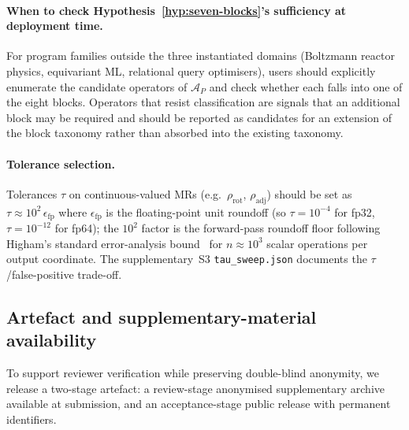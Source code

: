 \documentclass[acmsmall, screen]{acmart}
\begin{document}
\paragraph{When to check Hypothesis~\ref{hyp:seven-blocks}'s sufficiency at deployment time.} For program families outside the three instantiated domains (Boltzmann reactor physics, equivariant ML, relational query optimisers), users should explicitly enumerate the candidate operators of $\mathcal{A}_P$ and check whether each falls into one of the eight blocks. Operators that resist classification are signals that an additional block may be required and should be reported as candidates for an extension of the block taxonomy rather than absorbed into the existing taxonomy.

\paragraph{Tolerance selection.} Tolerances $\tau$ on continuous-valued MRs (e.g.\ $\rho_{\mathrm{rot}}$, $\rho_{\mathrm{adj}}$) should be set as $\tau \approx 10^{2}\, \epsilon_{\mathrm{fp}}$ where $\epsilon_{\mathrm{fp}}$ is the floating-point unit roundoff (so $\tau = 10^{-4}$ for fp32, $\tau = 10^{-12}$ for fp64); the $10^{2}$ factor is the forward-pass roundoff floor following Higham's standard error-analysis bound~\cite{Higham2002Accuracy} for $n \approx 10^{3}$ scalar operations per output coordinate. The supplementary~S3 \texttt{tau\_sweep.json} documents the $\tau$/false-positive trade-off.

\subsection{Artefact and supplementary-material availability}
\label{subsec:artefact}

To support reviewer verification while preserving double-blind anonymity, we release a two-stage artefact: a review-stage anonymised supplementary archive available at submission, and an acceptance-stage public release with permanent identifiers.
\end{document}
